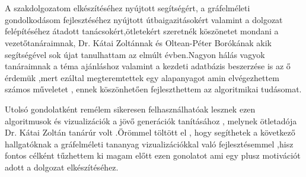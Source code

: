 \chapter*{\koszonetnyilvanitas}

A szakdolgozatom elkészítéséhez nyújtott segítségért, a gráfelméleti gondolkodásom fejlesztéséhez nyújtott útbaigazitásokért valamint a dolgozat felépítéséhez átadott tanácsokért,ötletekért szeretnék köszönetet mondani a vezetőtanáraimnak, Dr. Kátai Zoltánnak és Oltean-Péter Borókának akik segítségével sok újat tanulhattam az elmúlt évben.Nagyon hálás vagyok tanáraimnak a téma ajánláshoz valamint a kezdeti adatbázis beszerzése is az ő érdemük ,mert ezáltal megteremtettek egy alapanyagot amin elvégezhettem számos műveletet , ennek köszönhetően fejleszthettem az algoritmikai tudásomat.


Utolsó gondolatként remélem sikeresen felhasználhatóak lesznek ezen algoritmusok és vizualizációk a jövő generációk tanításához , melynek ötletadója Dr. Kátai Zoltán tanárúr volt .Örömmel töltött el , hogy segíthetek a következő hallgatóknak a gráfelméleti tananyag vizualizációkkal való fejlesztésemmel ,hisz fontos célként tűzhettem ki magam előtt ezen gonolatot ami egy plusz motivációt adott a dolgozat elkészítéséhez.